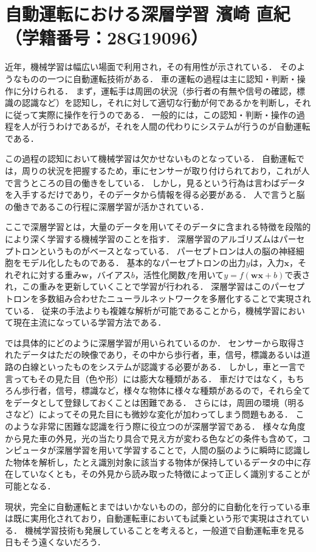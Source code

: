 \section*{\huge 自動運転における深層学習 \hspace{15mm} \large 濱崎 直紀（学籍番号：28G19096）}
近年，機械学習は幅広い場面で利用され，その有用性が示されている．
そのようなものの一つに自動運転技術がある．
車の運転の過程は主に認知・判断・操作に分けられる．
まず，運転手は周囲の状況（歩行者の有無や信号の確認，標識の認識など）を認知し，それに対して適切な行動が何であるかを判断し，それに従って実際に操作を行うのである．
一般的には，この認知・判断・操作の過程を人が行うわけであるが，それを人間の代わりにシステムが行うのが自動運転である．

この過程の認知において機械学習は欠かせないものとなっている．
自動運転では，周りの状況を把握するため，車にセンサーが取り付けられており，これが人で言うところの目の働きをしている．
しかし，見るという行為は言わばデータを入手するだけであり，そのデータから情報を得る必要がある．
人で言うと脳の働きであるこの行程に深層学習が活かされている．

ここで深層学習とは，大量のデータを用いてそのデータに含まれる特徴を段階的により深く学習する機械学習のことを指す．
深層学習のアルゴリズムはパーセプトロンというものがベースとなっている．
パーセプトロンは人の脳の神経細胞をモデル化したものである．
基本的なパーセプトロンの出力$y$は，入力$\bm{x}$，それぞれに対する重み$\bm{w}$，バイアス$b$，活性化関数$f$を用いて$y=f(\bm{wx}+b)$で表され，この重みを更新していくことで学習が行われる．
深層学習はこのパーセプトロンを多数組み合わせたニューラルネットワークを多層化することで実現されている．
従来の手法よりも複雑な解析が可能であることから，機械学習において現在主流になっている学習方法である．

では具体的にどのように深層学習が用いられているのか．
センサーから取得されたデータはただの映像であり，その中から歩行者，車，信号，標識あるいは道路の白線といったものをシステムが認識する必要がある．
しかし，車と一言で言ってもその見た目（色や形）には膨大な種類がある．
車だけではなく，もちろん歩行者，信号，標識など，様々な物体に様々な種類があるので，それら全てをデータとして登録しておくことは困難である．
さらには，周囲の環境（明るさなど）によってその見た目にも微妙な変化が加わってしまう問題もある．
このような非常に困難な認識を行う際に役立つのが深層学習である．
様々な角度から見た車の外見，光の当たり具合で見え方が変わる色などの条件も含めて，コンピュータが深層学習を用いて学習することで，人間の脳のように瞬時に認識した物体を解析し，たとえ識別対象に該当する物体が保持しているデータの中に存在していなくとも，その外見から読み取った特徴によって正しく識別することが可能となる．

現状，完全に自動運転とまではいかないものの，部分的に自動化を行っている車は既に実用化されており，自動運転車においても試乗という形で実現はされている．
機械学習技術も発展していることを考えると，一般道で自動運転車を見る日もそう遠くないだろう．
